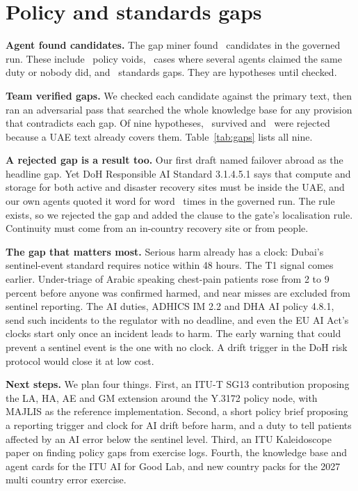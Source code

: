 \documentclass[10pt,twocolumn]{article}
\begin{document}
\section{Policy and standards gaps}

\textbf{Agent found candidates.} The gap miner found \GovGaps\ candidates in the governed run. These include \GovGOne\ policy voids, \GovGThree\ cases where several agents claimed the same duty or nobody did, and \GovGFive\ standards gaps. They are hypotheses until checked.

\textbf{Team verified gaps.} We checked each candidate against the primary text, then ran an adversarial pass that searched the whole knowledge base for any provision that contradicts each gap. Of nine hypotheses, \NGapsVerified\ survived and \NGapsRejected\ were rejected because a UAE text already covers them. Table~\ref{tab:gaps} lists all nine.

\textbf{A rejected gap is a result too.} Our first draft named failover abroad as the headline gap. Yet DoH Responsible AI Standard 3.1.4.5.1 says that compute and storage for both active and disaster recovery sites must be inside the UAE, and our own agents quoted it word for word \GovDRCites\ times in the governed run. The rule exists, so we rejected the gap and added the clause to the gate's localisation rule. Continuity must come from an in-country recovery site or from people.

\textbf{The gap that matters most.} Serious harm already has a clock: Dubai's sentinel-event standard requires notice within 48 hours. The T1 signal comes earlier. Under-triage of Arabic speaking chest-pain patients rose from 2 to 9 percent before anyone was confirmed harmed, and near misses are excluded from sentinel reporting. The AI duties, ADHICS IM 2.2 and DHA AI policy 4.8.1, send such incidents to the regulator with no deadline, and even the EU AI Act's clocks start only once an incident leads to harm. The early warning that could prevent a sentinel event is the one with no clock. A drift trigger in the DoH risk protocol would close it at low cost.

\textbf{Next steps.} We plan four things. First, an ITU\mbox{-}T SG13 contribution proposing the LA, HA, AE and GM extension around the Y.3172 policy node, with MAJLIS as the reference implementation. Second, a short policy brief proposing a reporting trigger and clock for AI drift before harm, and a duty to tell patients affected by an AI error below the sentinel level. Third, an ITU Kaleidoscope paper on finding policy gaps from exercise logs. Fourth, the knowledge base and agent cards for the ITU AI for Good Lab, and new country packs for the 2027 multi country error exercise.
\end{document}
